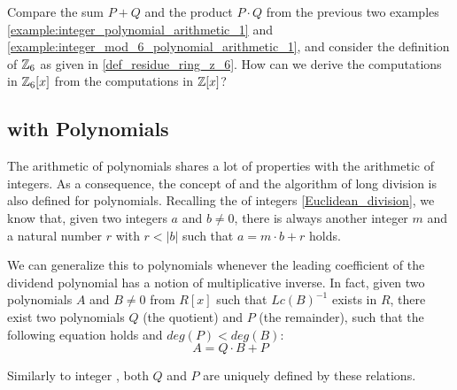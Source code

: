 \begin{exercise}
Compare the sum $P+Q$ and the product $P\cdot Q$ from the previous two examples \ref{example:integer_polynomial_arithmetic_1} and \ref{example:integer_mod_6_polynomial_arithmetic_1}, and consider the definition of $\mathbb{Z}_6$ as given in \examplename{} \ref{def_residue_ring_z_6}. How can we derive the computations in $\mathbb{Z}_6[x]$ from the computations in $\mathbb{Z}[x]$?
\end{exercise}
\subsection{ with Polynomials}
The arithmetic of polynomials shares a lot of properties with the arithmetic of integers. As a consequence, the concept of  and the algorithm of long division is also defined for polynomials. Recalling the  of integers \ref{Euclidean_division}, we know that, given two integers $a$ and $b\neq 0$, there is always another integer $m$ and a natural number $r$ with $r<|b|$ such that $a = m\cdot b +r$ holds.

We can generalize this to polynomials whenever the leading coefficient of the dividend polynomial has a notion of multiplicative inverse. In fact, given two polynomials $A$ and $B\neq 0$ from $R[x]$ such that $Lc(B)^{-1}$ exists in $R$, there exist two polynomials $Q$ (the quotient) and $P$ (the remainder), such that the following equation holds and $deg(P) < deg(B)$:
\begin{equation}
\label{eq_polynomial_euclidean_division_notation}
A = Q\cdot B + P
\end{equation}

Similarly to integer , both $Q$ and $P$ are uniquely defined by these relations.

